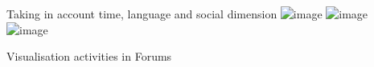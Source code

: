 \documentclass{beamer}
\begin{document}
\begin{frame}{Taking in account time, language and social dimension}
  \includegraphics<1>[width=\textwidth]{./Images/synthese1}
  \includegraphics<2>[width=\textwidth]{./Images/synthese2}
  \includegraphics<3>[width=\textwidth]{./Images/synthese3}
\end{frame}

\begin{frame}{Visualisation activities in Forums}
\end{frame}
\end{document}
